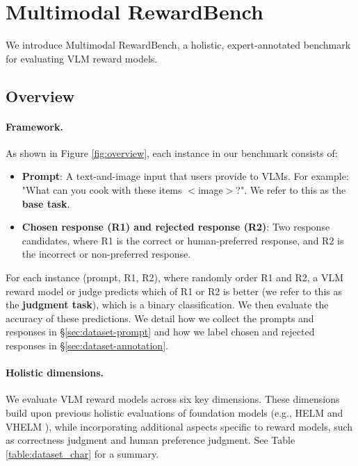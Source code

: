 \section{Multimodal RewardBench}
\label{sec:dataset}

We introduce Multimodal RewardBench, a holistic, expert-annotated benchmark for evaluating VLM reward models. 

\subsection{Overview}

\paragraph{Framework.}
As shown in Figure \ref{fig:overview}, each instance in our benchmark consists of:
\begin{itemize}
\setlength{\leftskip}{0mm}
    \item \textbf{Prompt}: A text-and-image input that users provide to VLMs. For example: "What can you cook with these items $<$image$>$?". We refer to this as the \textbf{base task}.
    \item \textbf{Chosen response (R1) and rejected response (R2)}: Two response candidates, where R1 is the correct or human-preferred response, and R2 is the incorrect or non-preferred response. 
\end{itemize}
For each instance (prompt, R1, R2), where randomly order R1 and R2, a VLM reward model or judge predicts which of R1 or R2 is better (we refer to this as the \textbf{judgment task}), which is a binary classification. We then evaluate the accuracy of these predictions.
We detail how we collect the prompts and responses in \S \ref{sec:dataset-prompt} and how we label chosen and rejected responses in \S \ref{sec:dataset-annotation}.


\paragraph{Holistic dimensions.}

We evaluate VLM reward models across six key dimensions. These dimensions build upon previous holistic evaluations of foundation models (e.g., HELM \citealt{liang2022holistic} and VHELM \citealt{lee2024vhelm}), while incorporating additional aspects specific to reward models, such as correctness judgment and human preference judgment. See Table \ref{table:dataset_char} for a summary.

